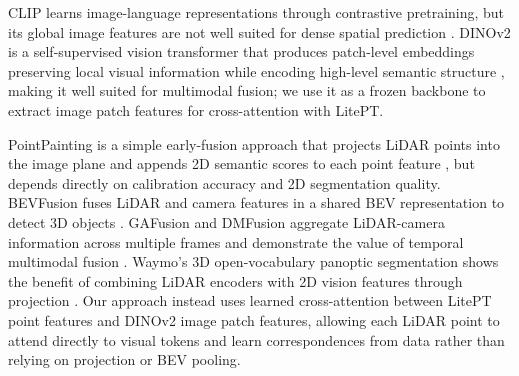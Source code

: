 \documentclass[10pt,twocolumn,letterpaper]{article}
\begin{document}
CLIP learns image-language representations through contrastive pretraining, but its global image features are not well suited for dense spatial prediction \cite{radford2021learningtransferablevisualmodels}. DINOv2 is a self-supervised vision transformer that produces patch-level embeddings preserving local visual information while encoding high-level semantic structure \cite{oquab2024dinov2learningrobustvisual}, making it well suited for multimodal fusion; we use it as a frozen backbone to extract image patch features for cross-attention with LitePT.

PointPainting is a simple early-fusion approach that projects LiDAR points into the image plane and appends 2D semantic scores to each point feature \cite{vora2020pointpaintingsequentialfusion3d}, but depends directly on calibration accuracy and 2D segmentation quality. BEVFusion fuses LiDAR and camera features in a shared BEV representation to detect 3D objects \cite{liu2024bevfusionmultitaskmultisensorfusion}. GAFusion and DMFusion aggregate LiDAR-camera information across multiple frames and demonstrate the value of temporal multimodal fusion \cite{li2024gafusionadaptivefusinglidar, MA2025107572}. Waymo's 3D open-vocabulary panoptic segmentation shows the benefit of combining LiDAR encoders with 2D vision features through projection \cite{xiao20243dopenvocabularypanopticsegmentation}. Our approach instead uses learned cross-attention between LitePT point features and DINOv2 image patch features, allowing each LiDAR point to attend directly to visual tokens and learn correspondences from data rather than relying on projection or BEV pooling.
\end{document}
